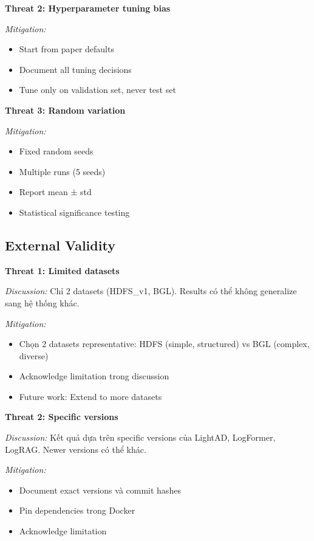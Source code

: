 \textbf{Threat 2: Hyperparameter tuning bias}

\textit{Mitigation:}
\begin{itemize}
    \item Start from paper defaults
    \item Document all tuning decisions
    \item Tune only on validation set, never test set
\end{itemize}

\textbf{Threat 3: Random variation}

\textit{Mitigation:}
\begin{itemize}
    \item Fixed random seeds
    \item Multiple runs (5 seeds)
    \item Report mean ± std
    \item Statistical significance testing
\end{itemize}

\subsection{External Validity}

\textbf{Threat 1: Limited datasets}

\textit{Discussion:} Chỉ 2 datasets (HDFS\_v1, BGL). Results có thể không generalize sang hệ thống khác.

\textit{Mitigation:}
\begin{itemize}
    \item Chọn 2 datasets representative: HDFS (simple, structured) vs BGL (complex, diverse)
    \item Acknowledge limitation trong discussion
    \item Future work: Extend to more datasets
\end{itemize}

\textbf{Threat 2: Specific versions}

\textit{Discussion:} Kết quả dựa trên specific versions của LightAD, LogFormer, LogRAG. Newer versions có thể khác.

\textit{Mitigation:}
\begin{itemize}
    \item Document exact versions và commit hashes
    \item Pin dependencies trong Docker
    \item Acknowledge limitation
\end{itemize}

